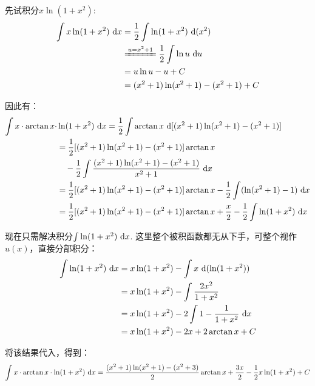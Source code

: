 \begin{solution}
先试积分$x \ln (1+x^2)$:
\begin{equation}
    \begin{aligned}
        \int x \ln (1+x^2) ~\d x
        &= \frac{1}{2} \int \ln (1+x^2) ~\d (x^2) \\
        &\xlongequal{u = x^2+1} \frac{1}{2} \int \ln u ~\d u \\
        &= u\ln u - u +C \\
        &= (x^2+1)\ln (x^2+1) -(x^2+1) +C
        \nonumber
    \end{aligned}
\end{equation} \par
因此有：
\begin{equation}
    \begin{aligned}
        \int x \cdot \arctan x \cdot & \ln (1+x^2)~\mathrm{d} x
        = \frac{1}{2} \int \arctan x ~\mathrm{d} [ (x^2+1)\ln (x^2+1) -(x^2+1) ] \\
        &= \frac{1}{2} [ (x^2+1)\ln (x^2+1) -(x^2+1) ]  \arctan x \\
        &\quad -\frac{1}{2} \int \frac{ (x^2+1)\ln (x^2+1) -(x^2+1) }{x^2+1} ~\mathrm{d} x \\
        &= \frac{1}{2} [ (x^2+1)\ln (x^2+1) -(x^2+1) ]  \arctan x -\frac{1}{2} \int (\ln(x^2+1)-1)~\mathrm{d} x \\
        &= \frac{1}{2} [ (x^2+1)\ln (x^2+1) -(x^2+1) ]  \arctan x +\frac{x}{2} -\frac{1}{2} \int \ln(1+x^2) ~\mathrm{d} x
        \nonumber
    \end{aligned}
\end{equation} \par

现在只需解决积分$\int \ln(1+x^2) ~\mathrm{d} x$.
这里整个被积函数都无从下手，可整个视作$u(x)$，直接分部积分：
\begin{equation}
    \begin{aligned}
        \int \ln(1+x^2) ~\mathrm{d} x
        &= x\ln(1+x^2) -\int x ~\mathrm{d} (\ln(1+x^2)) \\
        &= x\ln(1+x^2) -\int \frac{2x^2}{1+x^2} \\
        &= x\ln(1+x^2) -2\int 1-\frac{1}{1+x^2} ~\mathrm{d} x \\
        &= x\ln(1+x^2) -2x + 2\arctan x +C
        \nonumber
    \end{aligned}
\end{equation}

将该结果代入，得到：
$$
\int x \cdot \arctan x \cdot  \ln (1+x^2)~\mathrm{d} x  =
\frac{(x^2+1)\ln (x^2+1) -(x^2+3)}{2} \arctan x +\frac{3x}{2} -\frac{1}{2}x\ln(1+x^2) +C
$$
\end{solution}

